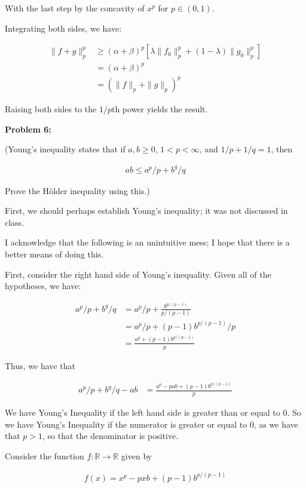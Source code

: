 \documentclass[a4paper,12pt]{article}
\newcommand{\shunt}{\vspace{20mm}}
\newcommand{\norm}[1]{\|#1\|}
\newcommand{\al}{\alpha} %
\newcommand{\be}{\beta}
\newcommand{\la}{\lambda}
\newcommand{\R}{\mathbb{R}}
\begin{document}
With the last step by the concavity of $x^p$ for $p \in (0,1)$.

Integrating both sides, we have:

\begin{align*}
\norm{f+g}_p^p &\geq (\al+\be)^p[\la \norm{f_0}_p^p+(1-\la)\norm{g_0}_p^p]\\
&=(\al+\be)^p\\
&=(\norm{f}_p+\norm{g}_p)^p
\end{align*}

Raising both sides to the $1/p$th power yields the result. 

\shunt

{\bf Problem 6:} 

(Young's inequality states that if $a,b \geq 0$, $1 < p < \infty$, and $1/p + 1/q =1$, then

\begin{align*}
ab \leq a^p/p + b^q/q
\end{align*}

Prove the H{\"o}lder inequality using this.)

First, we should perhaps establish Young's inequality; it was not discussed in class.

I acknowledge that the following is an unintuitive mess; I hope that there is a better means of doing this.

First, consider the right hand side of Young's inequality. Given all of the hypotheses, we have:

\begin{align*}
a^p/p + b^q/q &= a^p/p +\frac{b^{p/(p-1)}}{p/(p-1)}\\
&=a^p/p + (p-1)b^{p/(p-1)}/p\\
&=\frac{a^p+(p-1)b^{p/(p-1)}}{p}
\end{align*}

Thus, we have that

\begin{align*}
a^p/p+b^q/q -ab &= \frac{a^p-pab+(p-1)b^{p/(p-1)}}{p}
\end{align*}

We have Young's Inequality if the left hand side is greater than or equal to $0$. So we have Young's Inequality if the numerator is greater or equal to $0$, as we have that $p>1$, so that the denominator is positive.

Consider the function $f: \R \to \R$ given by 

\begin{align*}
f(x) = x^p-pxb+(p-1)b^{p/(p-1)}
\end{align*}
\end{document}
